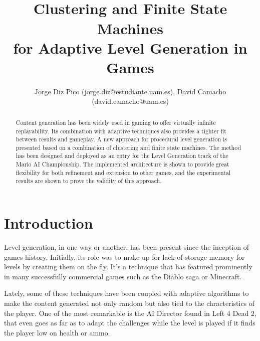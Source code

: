 \documentclass[conference]{IEEEtran}
\begin{document}
\title{\ \\ \LARGE\bf Clustering and Finite State Machines \\ for Adaptive Level Generation in Games}

\author{Jorge Diz Pico (jorge.diz@estudiante.uam.es), David Camacho (david.camacho@uam.es)}


\maketitle

\begin{abstract}
Content generation has been widely used in gaming
to offer virtually infinite replayability.
Its combination with adaptive techniques also provides a tighter fit between
results and gameplay.
A new approach for procedural level generation
is presented based on a combination of clustering and finite state machines.
The method has been designed and deployed as an entry for the 
Level Generation track of the Mario AI Championship.
The implemented architecture is shown to provide
great flexibility for both refinement and
extension to other games, and the
experimental results are shown to prove
the validity of this approach. 

\end{abstract}


\section{Introduction}
Level generation, in one way or another, has been present since the inception of games history. Initially, its role was to make up for lack of storage memory for levels by creating them on the fly. It's a technique that has featured prominently in many successfully commercial games such as the Diablo saga or Minecraft.

Lately, some of these techniques have been coupled with adaptive algorithms to make the content generated not only random but also tied to the chracteristics of the player. One of the most remarkable is the AI Director found in Left 4 Dead 2, that even goes as far as to adapt the challenges while the level is played if it finds the player low on health or ammo.
\end{document}

